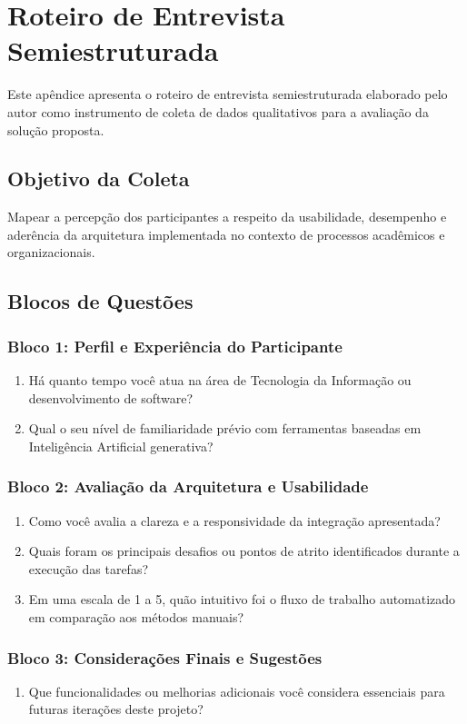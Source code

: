 \chapter{Roteiro de Entrevista Semiestruturada}
\label{apendice:roteiro-entrevista}

Este apêndice apresenta o roteiro de entrevista semiestruturada elaborado pelo autor como instrumento de coleta de dados qualitativos para a avaliação da solução proposta.

\section{Objetivo da Coleta}

Mapear a percepção dos participantes a respeito da usabilidade, desempenho e aderência da arquitetura implementada no contexto de processos acadêmicos e organizacionais.

\section{Blocos de Questões}

\subsection{Bloco 1: Perfil e Experiência do Participante}
\begin{enumerate}
    \item Há quanto tempo você atua na área de Tecnologia da Informação ou desenvolvimento de software?
    \item Qual o seu nível de familiaridade prévio com ferramentas baseadas em Inteligência Artificial generativa?
\end{enumerate}

\subsection{Bloco 2: Avaliação da Arquitetura e Usabilidade}
\begin{enumerate}
    \item Como você avalia a clareza e a responsividade da integração apresentada?
    \item Quais foram os principais desafios ou pontos de atrito identificados durante a execução das tarefas?
    \item Em uma escala de 1 a 5, quão intuitivo foi o fluxo de trabalho automatizado em comparação aos métodos manuais?
\end{enumerate}

\subsection{Bloco 3: Considerações Finais e Sugestões}
\begin{enumerate}
    \item Que funcionalidades ou melhorias adicionais você considera essenciais para futuras iterações deste projeto?
\end{enumerate}
